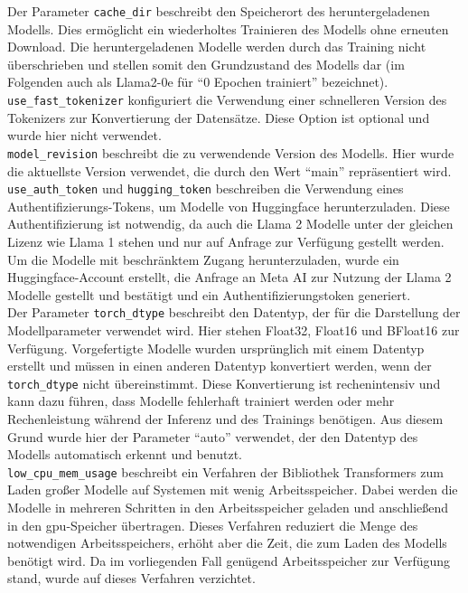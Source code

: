 Der Parameter \texttt{cache\_dir} beschreibt den Speicherort des heruntergeladenen Modells.
Dies ermöglicht ein wiederholtes Trainieren des Modells ohne erneuten Download.
Die heruntergeladenen Modelle werden durch das Training nicht überschrieben und stellen somit den Grundzustand des Modells dar (im Folgenden auch als Llama2-$0$e für \enquote{$0$ Epochen trainiert} bezeichnet).\\

\texttt{use\_fast\_tokenizer} konfiguriert die Verwendung einer schnelleren Version des Tokenizers zur Konvertierung der Datensätze.
Diese Option ist optional und wurde hier nicht verwendet.\\

\texttt{model\_revision} beschreibt die zu verwendende Version des Modells.
Hier wurde die aktuellste Version verwendet, die durch den Wert \enquote{main} repräsentiert wird.\\
\texttt{use\_auth\_token} und \texttt{hugging\_token} beschreiben die Verwendung eines Authentifizierungs-Tokens, um Modelle von Huggingface herunterzuladen.
Diese Authentifizierung ist notwendig, da auch die Llama 2 Modelle unter der gleichen Lizenz wie Llama 1 stehen und nur auf Anfrage zur Verfügung gestellt werden.
Um die Modelle mit beschränktem Zugang herunterzuladen, wurde ein Huggingface-Account erstellt, die Anfrage an Meta AI zur Nutzung der Llama 2 Modelle gestellt und bestätigt und ein Authentifizierungstoken generiert.\\

Der Parameter \texttt{torch\_dtype} beschreibt den Datentyp, der für die Darstellung der Modellparameter verwendet wird.
Hier stehen Float32, Float16 und BFloat16 zur Verfügung.
Vorgefertigte Modelle wurden ursprünglich mit einem Datentyp erstellt und müssen in einen anderen Datentyp konvertiert werden, wenn der \texttt{torch\_dtype} nicht übereinstimmt.
Diese Konvertierung ist rechenintensiv und kann dazu führen, dass Modelle fehlerhaft trainiert werden oder mehr Rechenleistung während der Inferenz und des Trainings benötigen.
Aus diesem Grund wurde hier der Parameter \enquote{auto} verwendet, der den Datentyp des Modells automatisch erkennt und benutzt.\\

\texttt{low\_cpu\_mem\_usage} beschreibt ein Verfahren der Bibliothek Transformers zum Laden großer Modelle auf Systemen mit wenig Arbeitsspeicher.
Dabei werden die Modelle in mehreren Schritten in den Arbeitsspeicher geladen und anschließend in den \ac{gpu}-Speicher übertragen.
Dieses Verfahren reduziert die Menge des notwendigen Arbeitsspeichers, erhöht aber die Zeit, die zum Laden des Modells benötigt wird.
Da im vorliegenden Fall genügend Arbeitsspeicher zur Verfügung stand, wurde auf dieses Verfahren verzichtet.

